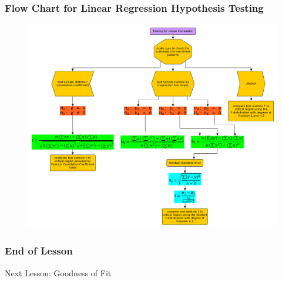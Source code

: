 \documentclass[xcolor=dvipsnames]{beamer}
\begin{document}
\begin{frame}
  \frametitle{Flow Chart for Linear Regression Hypothesis Testing}
\begin{figure}[h]
\includegraphics[scale=.24]{./diagrams/linear-regression.png}
\end{figure}
\end{frame}

\begin{frame}
  \frametitle{End of Lesson}
Next Lesson: Goodness of Fit
\end{frame}
\end{document}
